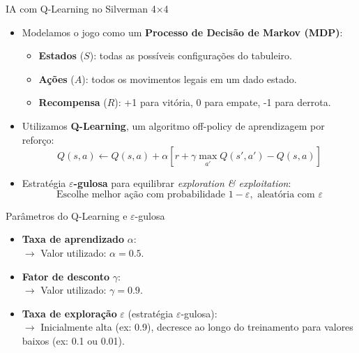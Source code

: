 \documentclass{beamer}
\begin{document}
\begin{frame}{IA com Q-Learning no Silverman 4×4}
\begin{itemize}
  \item Modelamos o jogo como um \textbf{Processo de Decisão de Markov (MDP)}:
  \begin{itemize}
    \item \textbf{Estados} (\( S \)): todas as possíveis configurações do tabuleiro.
    \item \textbf{Ações} (\( A \)): todos os movimentos legais em um dado estado.
    \item \textbf{Recompensa} (\( R \)): +1 para vitória, 0 para empate, -1 para derrota.
  \end{itemize}
  \item Utilizamos \textbf{Q-Learning}, um algoritmo off-policy de aprendizagem por reforço:
  \[
  Q(s,a) \leftarrow Q(s,a) + \alpha \left[ r + \gamma \max_{a'} Q(s',a') - Q(s,a) \right]
  \]
  \item Estratégia \textbf{$\varepsilon$-gulosa} para equilibrar \textit{exploration \& exploitation}:
  \[
  \text{Escolhe melhor ação com probabilidade } 1 - \varepsilon, \text{ aleatória com } \varepsilon
  \]
\end{itemize}
\end{frame}

\begin{frame}{Parâmetros do Q-Learning e $\varepsilon$-gulosa}
\begin{itemize}
  \item \textbf{Taxa de aprendizado} \(\alpha\): \\
        \(\rightarrow\) Valor utilizado: \(\alpha = 0.5\).
  
  \item \textbf{Fator de desconto} \(\gamma\):  \\
        \(\rightarrow\) Valor utilizado: \(\gamma = 0.9\).
  
  \item \textbf{Taxa de exploração} \(\varepsilon\) (estratégia $\varepsilon$-gulosa): \\
        \(\rightarrow\) Inicialmente alta (ex: 0.9), decresce ao longo do treinamento para valores baixos (ex: 0.1 ou 0.01).
\end{itemize}
\end{frame}
\end{document}
